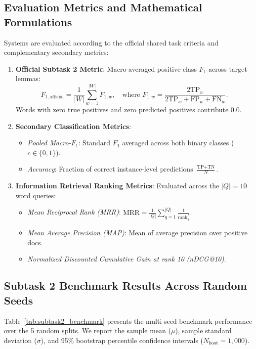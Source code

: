 \subsection{Evaluation Metrics and Mathematical Formulations}
Systems are evaluated according to the official shared task criteria and complementary secondary metrics:
\begin{enumerate}
    \item \textbf{Official Subtask 2 Metric}: Macro-averaged positive-class $F_1$ across target lemmas:
    \begin{equation}
    F_{1,\text{official}} = \frac{1}{|W|} \sum_{w=1}^{|W|} F_{1,w}, \quad \text{where } F_{1,w} = \frac{2\text{TP}_w}{2\text{TP}_w + \text{FP}_w + \text{FN}_w}.
    \end{equation}
    Words with zero true positives and zero predicted positives contribute $0.0$.
    \item \textbf{Secondary Classification Metrics}:
    \begin{itemize}
        \item \textit{Pooled Macro-$F_1$}: Standard $F_1$ averaged across both binary classes ($c \in \{0, 1\}$).
        \item \textit{Accuracy}: Fraction of correct instance-level predictions $\frac{\text{TP} + \text{TN}}{N}$.
    \end{itemize}
    \item \textbf{Information Retrieval Ranking Metrics}: Evaluated across the $|Q|=10$ word queries:
    \begin{itemize}
        \item \textit{Mean Reciprocal Rank (MRR)}: $\text{MRR} = \frac{1}{|Q|} \sum_{q=1}^{|Q|} \frac{1}{\text{rank}_q^*}$.
        \item \textit{Mean Average Precision (MAP)}: Mean of average precision over positive docs.
        \item \textit{Normalized Discounted Cumulative Gain at rank 10 (nDCG@10)}.
    \end{itemize}
\end{enumerate}

\subsection{Subtask 2 Benchmark Results Across Random Seeds}
Table~\ref{tab:subtask2_benchmark} presents the multi-seed benchmark performance over the 5 random splits. We report the sample mean ($\mu$), sample standard deviation ($\sigma$), and 95\% bootstrap percentile confidence intervals ($N_{\text{boot}}=1,000$).

